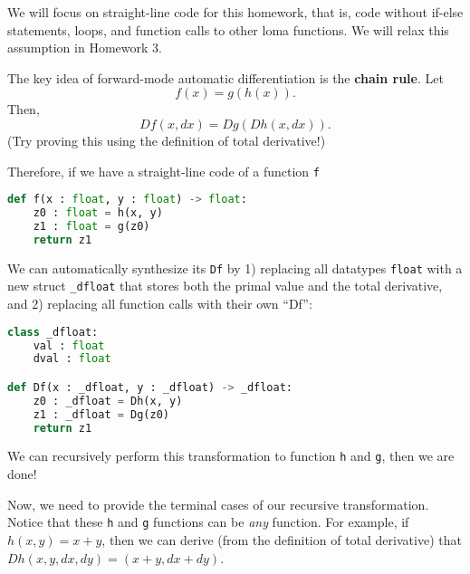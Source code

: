 We will focus on straight-line code for this homework, that is, code without if-else statements, loops, and function calls to other loma functions. We will relax this assumption in Homework 3. 

The key idea of forward-mode automatic differentiation is the \textbf{chain rule}. Let
\begin{equation}
    f(x) = g(h(x)).
\end{equation}
Then,
\begin{equation}
    Df(x, dx) = Dg(Dh(x, dx)).
\end{equation}
(Try proving this using the definition of total derivative!)

Therefore, if we have a straight-line code of a function \lstinline{f}
\begin{lstlisting}[language=Python]
def f(x : float, y : float) -> float:
    z0 : float = h(x, y)
    z1 : float = g(z0)
    return z1
\end{lstlisting}
We can automatically synthesize its \lstinline{Df} by 1) replacing all datatypes \lstinline{float} with a new struct \lstinline{_dfloat} that stores both the primal value and the total derivative, and 2) replacing all function calls with their own ``Df'':
\begin{lstlisting}[language=Python]
class _dfloat:
    val : float
    dval : float

def Df(x : _dfloat, y : _dfloat) -> _dfloat:
    z0 : _dfloat = Dh(x, y)
    z1 : _dfloat = Dg(z0)
    return z1
\end{lstlisting}
We can recursively perform this transformation to function \lstinline{h} and \lstinline{g}, then we are done!

Now, we need to provide the terminal cases of our recursive transformation. Notice that these \lstinline{h} and \lstinline{g} functions can be \emph{any} function. For example, if $h(x, y) = x + y$, then we can derive (from the definition of total derivative) that $Dh(x, y, dx, dy) = (x + y, dx + dy)$. 

